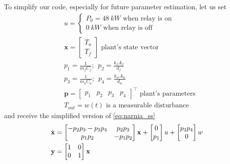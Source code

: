 \documentclass[../main.tex]{subfiles}
\begin{document}
To simplify our code, especially for future parameter estimation, let us set
\begin{equation*}
\begin{aligned}
    &u = \left\{ \begin{aligned}
        P_0 = 48 ~kW \text{ when relay is on} \\
        0 ~kW \text{ when relay is off}
    \end{aligned} \right. \\
    &\mathbf{x} = \begin{bmatrix}
      T_a \\
      T_f
    \end{bmatrix} \text{  plant's state vector} \\
    &p_1 = \frac{1}{m_f C_f};~~
    p_2 = \frac{k_f A_f}{d_f}\\
    &p_3 = \frac{1}{m_a C_a};~~
    p_4 = \frac{k_w A_w}{d_w}\\
    &\mathbf{p} = \begin{bmatrix}
        p_1 & p_2 & p_3 & p_4
    \end{bmatrix}^\top \text{  plant's parameters} \\
    &T_{out} = w(t) \text{  is a measurable disturbance}
\end{aligned}
\end{equation*}
and receive the simplified version of \ref{eq:narnia_ss}
\begin{align}\label{eq:narnia_sss}
    \dot{\mathbf{x}} &=
        \begin{bmatrix}
            -p_2 p_3 - p_3 p_4 & p_2 p_3 \\
            p_1 p_2 & -p_1 p_2
        \end{bmatrix}\mathbf{x}
        + \begin{bmatrix}
            0 \\
            p_1
        \end{bmatrix}u + \begin{bmatrix}
            p_3 p_4 \\
            0
        \end{bmatrix}w \\
    \mathbf{y} &= \begin{bmatrix}
        1 & 0 \\
        0 & 1
    \end{bmatrix}\mathbf{x} \notag
\end{align}
\end{document}
